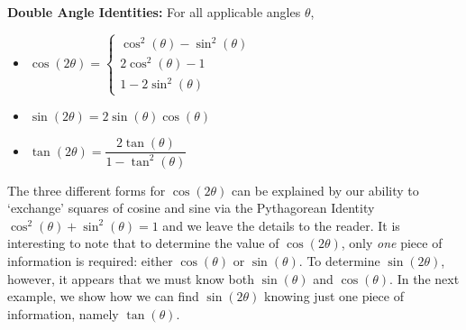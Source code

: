 \colorbox{ResultColor}{\bbm

\begin{thm} \label{doubleangle}  \textbf{Double Angle Identities:} For all applicable angles $\theta$, 

\begin{itemize}

\item  $\cos(2\theta) = \left\{ \begin{array}{l} \cos^{2}(\theta) - \sin^{2}(\theta)\\ [5pt]  2\cos^{2}(\theta) - 1 \\ [5pt] 1-2\sin^{2}(\theta) \end{array} \right.$

\item $\sin(2\theta) = 2\sin(\theta)\cos(\theta)$

\item  $\tan(2\theta) = \dfrac{2\tan(\theta)}{1 - \tan^{2}(\theta)}$

\end{itemize}

\end{thm}

\ebm}

\smallskip

The three different forms for $\cos(2\theta)$ can be explained by our ability to `exchange' squares of cosine and sine via the Pythagorean Identity $\cos^{2}(\theta) + \sin^{2}(\theta) = 1$ and we leave the details to the reader.  It is interesting to note that to determine the value of $\cos(2\theta)$, only \textit{one} piece of information is required: either $\cos(\theta)$ or $\sin(\theta)$.  To determine $\sin(2\theta)$, however, it appears that we must know both $\sin(\theta)$ and $\cos(\theta)$.  In the next example, we show how we can find $\sin(2\theta)$ knowing just one piece of information, namely $\tan(\theta)$.

